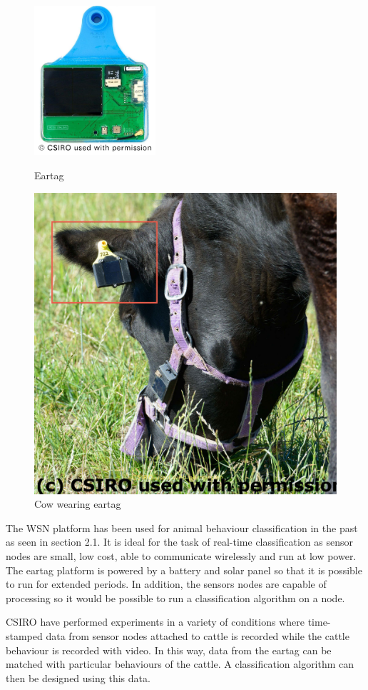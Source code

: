 \begin{figure}[H]
\centering
\begin{minipage}{.5\textwidth}
  \centering
  \includegraphics[width=0.4\textwidth]{images/eartag.png}
  \caption{Eartag}
  \label{eartag}
\end{minipage}%
\begin{minipage}{.5\textwidth}
  \centering
  \includegraphics[width=.5\textwidth]{images/cow.jpg}
  \caption{Cow wearing eartag}
  \label{cow}
\end{minipage}
\end{figure}


The WSN platform has been used for animal behaviour classification in the past as seen in section 2.1. It is ideal for the task of real-time classification as sensor nodes are small, low cost, able to communicate wirelessly and run at low power. The eartag platform is powered by a battery and solar panel so that it is possible to run for extended periods. In addition, the sensors nodes are capable of processing so it would be possible to run a classification algorithm on a node. 

CSIRO have performed experiments in a variety of conditions where time-stamped data from sensor nodes attached to cattle is recorded while the cattle behaviour is recorded with video. In this way, data from the eartag can be matched with particular behaviours of the cattle. A classification algorithm can then be designed using this data.

